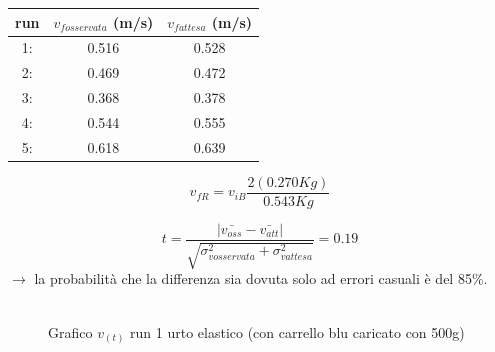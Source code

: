 \documentclass[a4paper]{article}
\theoremstyle{definition}
\begin{document}
\begin{minipage}[c]{0.5\textwidth}
			\captionsetup{labelformat=empty}
	\centering
	\begin{tabular}{||ccc||}
		\hline
		\hline
		run &  \(v_{fosservata}\) (m/s) & \(v_{fattesa}\) (m/s)\\
		\hline
		1: & 0.516 & 0.528 \\
		2: & 0.469& 0.472\\
		3: & 0.368& 0.378\\
		4: & 0.544& 0.555\\
		5: & 0.618& 0.639\\
		\hline
		\hline
	\end{tabular}
\end{minipage}

\[v_{f R} = v_{i B} \frac{2 (0.270 Kg)}{0.543 Kg}\]

\[t = \frac{ \left |\bar{v_{oss}}  - \bar{v_{att}} \right |}{\sqrt{\sigma_{vosservata}^{2}+ \sigma_{vattesa}^{2}}} = 0.19\]
\noindent \(\rightarrow\) la probabilità che la differenza sia dovuta solo ad errori casuali è del 85\(\%\).\\\\

\begin{figure}[!ht]
	\captionsetup{labelformat=empty}
	\caption{Grafico \(v_{(t)}\) run 1 urto elastico (con carrello blu caricato con 500g)}
	
\end{figure}
\end{document}
